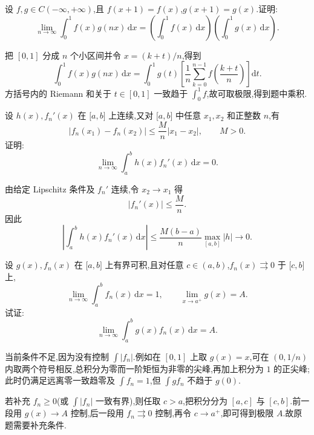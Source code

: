 \begin{example}
    设 $f,g\in C(-\infty,+\infty)$,且 $f(x+1)=f(x)$,$g(x+1)=g(x)$.证明:
    \[
        \displaystyle\lim\limits_{n\to\infty}\int_0^1f(x)g(nx)\,\mathrm{d}x
        =\left(\int_0^1f(x)\,\mathrm{d}x\right)
        \left(\int_0^1g(x)\,\mathrm{d}x\right).
    \]
\end{example}
\exampleblank

\begin{solution}
    把 $[0,1]$ 分成 $n$ 个小区间并令 $x=(k+t)/n$,得到
    \[
        \displaystyle\int_0^1f(x)g(nx)\,\mathrm{d}x
        =\int_0^1g(t)\left[\dfrac{1}{n}\sum\limits_{k=0}^{n-1}f\left(\dfrac{k+t}{n}\right)\right]\mathrm{d}t.
    \]
    方括号内的 Riemann 和关于 $t\in[0,1]$ 一致趋于 $\displaystyle\int_0^1f$,故可取极限,得到题中乘积.
\end{solution}

\begin{example}
    设 $h(x),f_n'(x)$ 在 $\lbrack a,b\rbrack$ 上连续,又对 $\lbrack a,b\rbrack$ 中任意 $x_1,x_2$ 和正整数 $n$,有
    \[
        |f_n(x_1)-f_n(x_2)|\leq\dfrac{M}{n}|x_1-x_2|,
        \qquad M>0.
    \]
    证明:
    \[
        \displaystyle\lim\limits_{n\to\infty}\int_a^bh(x)f_n'(x)\,\mathrm{d}x=0.
    \]
\end{example}
\exampleblank

\begin{solution}
    由给定 Lipschitz 条件及 $f_n'$ 连续,令 $x_2\to x_1$ 得
    \[
        |f_n'(x)|\leq\dfrac{M}{n}.
    \]
    因此
    \[
        \left|\int_a^bh(x)f_n'(x)\,\mathrm{d}x\right|
        \leq\dfrac{M(b-a)}n\max_{[a,b]}|h|\longrightarrow0.
    \]
\end{solution}

\begin{example}
    设 $g(x),f_n(x)$ 在 $\lbrack a,b\rbrack$ 上有界可积,且对任意 $c\in(a,b)$,$f_n(x)\rightrightarrows0$ 于 $\lbrack c,b\rbrack$ 上,
    \[
        \displaystyle\lim\limits_{n\to\infty}\int_a^bf_n(x)\,\mathrm{d}x=1,
        \qquad
        \lim\limits_{x\to a^+}g(x)=A.
    \]
    试证:
    \[
        \displaystyle\lim\limits_{n\to\infty}\int_a^bg(x)f_n(x)\,\mathrm{d}x=A.
    \]
\end{example}
\exampleblank

\begin{solution}
    当前条件不足,因为没有控制 $\displaystyle\int|f_n|$.例如在 $[0,1]$ 上取 $g(x)=x$,可在 $(0,1/n)$ 内取两个符号相反,总积分为零而一阶矩恒为非零的尖峰,再加上积分为 $1$ 的正尖峰;此时仍满足远离零一致趋零及 $\displaystyle\int f_n=1$,但 $\displaystyle\int gf_n$ 不趋于 $g(0)$.

    若补充 $f_n\geq0$(或 $\displaystyle\int|f_n|$ 一致有界),则任取 $c>a$,把积分分为 $[a,c]$ 与 $[c,b]$.前一段用 $g(x)\to A$ 控制,后一段用 $f_n\rightrightarrows0$ 控制,再令 $c\to a^+$,即可得到极限 $A$.故原题需要补充条件.
\end{solution}

